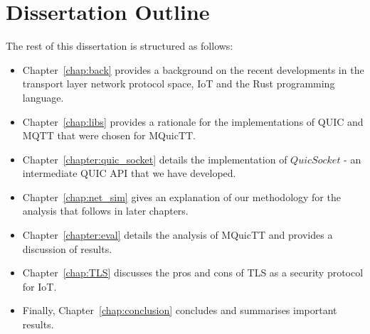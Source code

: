\section{Dissertation Outline}

The rest of this dissertation is structured as follows:
\begin{itemize}
    \item Chapter~\ref{chap:back} provides a background on the recent developments in the transport layer network protocol space, IoT and the Rust programming language.
    \item Chapter~\ref{chap:libs} provides a rationale for the implementations of QUIC and MQTT that were chosen for MQuicTT.
    \item Chapter~\ref{chapter:quic_socket} details the implementation of $QuicSocket$ - an intermediate QUIC API that we have developed.
    \item Chapter~\ref{chap:net_sim} gives an explanation of our methodology for the analysis that follows in later chapters.
    \item Chapter~\ref{chapter:eval} details the analysis of MQuicTT and provides a discussion of results.
    \item Chapter~\ref{chap:TLS} discusses the pros and cons of TLS as a security protocol for IoT.
    \item Finally, Chapter~\ref{chap:conclusion} concludes and summarises important results.
\end{itemize}